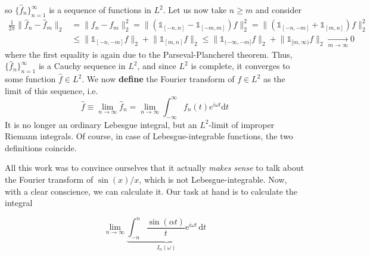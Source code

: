 so \(\{\hat{f}_n\}_{n=1}^{\infty }\) is a sequence of functions in \(L^2\).
Let us now take \(n \geq m\) and consider
\begin{align*}
    \frac{1}{2\pi }\lVert \hat{f} _n - \hat{f} _m \rVert _2 & = \lVert f_n - f_m \rVert_2^2 = \lVert ( \mathbb{1}_{[-n,n]} - \mathbb{1}_{[-m,m]} ) f \rVert_2^2
    = \lVert ( \mathbb{1}_{[-n,-m]} + \mathbb{1}_{[m,n]} ) f \rVert_2^2                                                                                         \\
                                                            & \leq \lVert \mathbb{1}_{[-n,-m]} f \rVert_2 + \lVert \mathbb{1}_{[m,n]} f \rVert_2
    \leq \lVert \mathbb{1}_{(-\infty ,-m]} f \rVert_2 + \lVert \mathbb{1}_{[m,\infty )} f \rVert_2 \xrightarrow[m\to \infty ]{} 0
\end{align*}
where the first equality is again due to the Parseval-Plancherel theorem.
Thus, \(\{\hat{f} _n\}_{n=1}^{\infty}\) is a Cauchy sequence in \(L^2\), and since \(L^2\) is complete, it converges to some
function \(\hat{f} \in L^2\). We now \textbf{define} the Fourier transform of \(f\in L^2\) as the limit of this sequence,
i.e.
\begin{equation}
    \hat{f} \equiv  \lim_{n \to \infty} \hat{f} _n = \lim_{n \to \infty} \int_{-\infty}^{\infty} f_n(t) e^{i \omega t} \mathrm{d}t
\end{equation}
It is no longer an ordinary Lebesgue integral, but an \(L^2\)-limit of improper Riemann integrals. Of course, in case
of Lebesgue-integrable functions, the two definitions coincide.

All this work was to convince ourselves that it actually \textit{makes sense} to talk about the Fourier transform of
\(\sin (x)/x\), which is not Lebesgue-integrable. Now, with a clear conscience, we can calculate it.
Our task at hand is to calculate the integral

\begin{equation}
    \lim_{n \to \infty} \underbrace{\int_{-n}^{n} \frac{\sin (\alpha t)}{t} \mathrm{e}^{i \omega  t} \,\mathrm{d}t}_{I_n(\omega )}
\end{equation}

